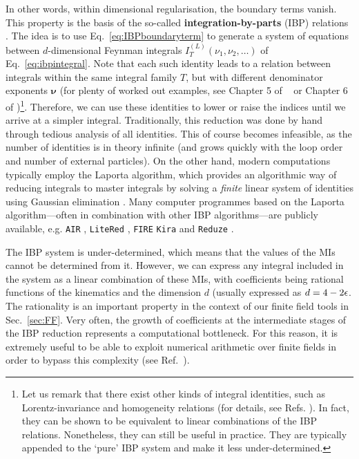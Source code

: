 \documentclass[main.tex]{subfiles}
\begin{document}
In other words, within dimensional regularisation, the boundary terms vanish. This property is the basis of the so-called \textbf{integration-by-parts} (IBP) relations \cite{Chetyrkin:1981qh}. The idea is to use Eq.~\ref{eq:IBPboundaryterm} to generate a system of equations between $d$-dimensional Feynman integrals $I_T^{(L)}(\nu_1, \nu_2, \ldots)$ of Eq.~\ref{eq:ibpintegral}. Note that each such identity leads to a relation between integrals within the same integral family $T$, but with different denominator exponents $\bm{\nu}$ (for plenty of worked out examples, see Chapter 5 of ~\cite{smirnov2006feynman} or Chapter 6 of \cite{Weinzierl:2022eaz})\footnote{Let us remark that there exist other kinds of integral identities, such as Lorentz-invariance and homogeneity relations (for details, see Refs. \cite{Grozin:2011mt, Lee:2008tj, Lee:2012cn}). In fact, they can be shown to be equivalent to linear combinations of the IBP relations. Nonetheless, they can still be useful in practice. They are typically appended to the `pure' IBP system and make it less under-determined.}. Therefore, we can use these identities to lower or raise the indices until we arrive at a simpler integral. Traditionally, this reduction was done by hand through tedious analysis of all identities. This of course becomes infeasible, as the number of identities is in theory infinite (and grows quickly with the loop order and number of external particles). On the other hand, modern computations typically employ the Laporta algorithm, which provides an algorithmic way of reducing integrals to master integrals by solving a \textit{finite} linear system of identities using Gaussian elimination \cite{Laporta:2001dd}. Many computer programmes based on the Laporta algorithm---often in combination with other IBP algorithms---are publicly available, e.g. \texttt{AIR} \cite{Anastasiou:2004vj}, \texttt{LiteRed} \cite{Lee:2012cn, Lee:2013mka}, \texttt{FIRE} \cite{Smirnov:2008iw, Smirnov:2019qkx} \texttt{Kira} \cite{Maierhofer:2017gsa, Klappert:2020nbg} and \texttt{Reduze} \cite{Studerus:2009ye, vonManteuffel:2012np}.

The IBP system is under-determined, which means that the values of the MIs cannot be determined from it. However, we can express any integral included in the system as a linear combination of these MIs, with coefficients being rational functions of the kinematics and the dimension $d$ (usually expressed as $d=4-2\epsilon$. The rationality is an important property in the context of our finite field tools in Sec.~\ref{sec:FF}. Very often, the growth of coefficients at the intermediate stages of the IBP reduction represents a computational bottleneck. For this reason, it is extremely useful to be able to exploit numerical arithmetic over finite fields in order to bypass this complexity (see Ref.~\cite{Peraro:2019svx}).
\end{document}
